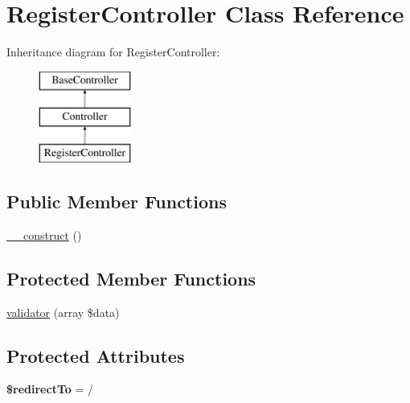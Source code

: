 \hypertarget{class_app_1_1_http_1_1_controllers_1_1_auth_1_1_register_controller}{}\section{Register\+Controller Class Reference}
\label{class_app_1_1_http_1_1_controllers_1_1_auth_1_1_register_controller}
Inheritance diagram for Register\+Controller\+:\begin{figure}[H]
\begin{center}
\leavevmode
\includegraphics[height=3.000000cm]{class_app_1_1_http_1_1_controllers_1_1_auth_1_1_register_controller}
\end{center}
\end{figure}
\subsection*{Public Member Functions}
\begin{DoxyCompactItemize}
\item 
\mbox{\hyperlink{class_app_1_1_http_1_1_controllers_1_1_auth_1_1_register_controller_a095c5d389db211932136b53f25f39685}{\+\_\+\+\_\+construct}} ()
\end{DoxyCompactItemize}
\subsection*{Protected Member Functions}
\begin{DoxyCompactItemize}
\item 
\mbox{\hyperlink{class_app_1_1_http_1_1_controllers_1_1_auth_1_1_register_controller_aa47350de63ea5295d9c9718e3d09135c}{validator}} (array \$data)
\end{DoxyCompactItemize}
\subsection*{Protected Attributes}
\begin{DoxyCompactItemize}
\item 
\mbox{\label{class_app_1_1_http_1_1_controllers_1_1_auth_1_1_register_controller_a1d19101ee5de7186666ce86a530cd501}} 
{\bfseries \$redirect\+To} = \textquotesingle{}/\textquotesingle{}
\end{DoxyCompactItemize}


